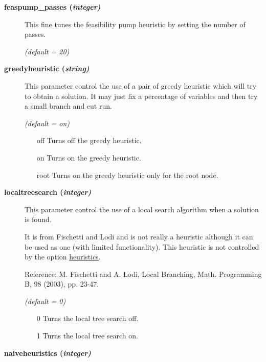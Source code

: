 \begin{description}
\item[\label{feaspump_passes}\hypertarget{feaspump_passes}
{\textbf{feaspump\_passes (\slshape{integer})}}]\hspace{1.0in}

This fine tunes the feasibility pump heuristic by setting the number of passes.

\textsl{(default = 20)}

\item[\label{greedyheuristic}\hypertarget{greedyheuristic}
{\textbf{greedyheuristic (\slshape{string})}}]\hspace{1.0in}

This parameter control the use of a pair of greedy heuristic which will try to obtain a solution.
It may just fix a percentage of variables and then try a small branch and cut run.

\textsl{(default = on)}
\begin{itemize}
\item[off] 
Turns off the greedy heuristic.
\item[on] 
Turns on the greedy heuristic.
\item[root] 
Turns on the greedy heuristic only for the root node.
\end{itemize}

\item[\label{localtreesearch}\hypertarget{localtreesearch}
{\textbf{localtreesearch (\slshape{integer})}}]\hspace{1.0in}

This parameter control the use of a local search algorithm when a solution is found.

It is from Fischetti and Lodi and is not really a heuristic although it can be used as one (with limited functionality).
This heuristic is not controlled by the option \hyperlink{heuristics}{heuristics}.

Reference: M. Fischetti and A. Lodi, Local Branching, Math. Programming B, 98 (2003), pp. 23-47.

\textsl{(default = 0)}
\begin{itemize}
\item[0] 
Turns the local tree search off.
\item[1] 
Turns the local tree search on.
\end{itemize}

\item[\label{naiveheuristics}\hypertarget{naiveheuristics}
{\textbf{naiveheuristics (\slshape{integer})}}]\hspace{1.0in}


\end{description}
